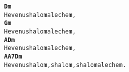 \begin{minipage}{\textwidth}
\kottastart
{}
\kottaend
\begin{minipage}{\textwidth}
\begin{multicols}{2}
\begin{minipage}{\textwidth}
\begin{alltt}
\textbf{         Dm}
Hevenu shalom alechem,
\textbf{         Gm}
Hevenu shalom alechem,
\textbf{         A      Dm}
Hevenu shalom alechem,
\textbf{         A               A7        Dm}
Hevenu shalom, shalom, shalom alechem.
\end{alltt}
\vspace{0.0cm}
\versszakspacing
\end{minipage}
\vspace{0.2cm}
\end{multicols}
\end{minipage}

\end{minipage}
~\vspace{1.0cm}
\newline
